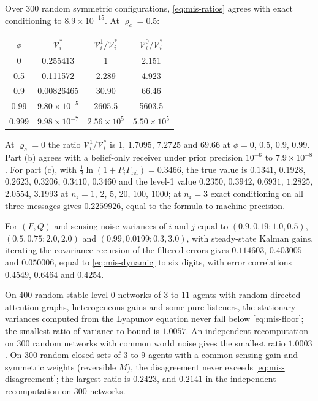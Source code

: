 \begin{numcheck}\label{chk:mis-ratios}
Over 300 random symmetric configurations, \eqref{eq:mis-ratios} agrees with exact conditioning to $8.9\times10^{-15}$. At $\varrho_c=0.5$:
\begin{center}\small
\begin{tabular}{@{}cccc@{}}
\toprule
$\phi$ & $\mathcal V^\ast_i$ & $\mathcal V^1_i/\mathcal V^\ast_i$ & $\mathcal V^0_i/\mathcal V^\ast_i$\\
\midrule
0 & 0.255413 & 1 & 2.151\\
0.5 & 0.111572 & 2.289 & 4.923\\
0.9 & 0.00826465 & 30.90 & 66.46\\
0.99 & $9.80\times10^{-5}$ & 2605.5 & 5603.5\\
0.999 & $9.98\times10^{-7}$ & $2.56\times10^5$ & $5.50\times10^5$\\
\bottomrule
\end{tabular}
\end{center}
At $\varrho_c=0$ the ratio $\mathcal V^1_i/\mathcal V^\ast_i$ is $1$, $1.7095$, $7.2725$ and $69.66$ at $\phi=0$, $0.5$, $0.9$, $0.99$. Part (b) agrees with a belief-only receiver under prior precision $10^{-6}$ to $7.9\times10^{-8}$. For part (c), with $\tfrac12\ln(1+P_i\Gamma_{\mathrm{rel}})=0.3466$, the true value is $0.1341$, $0.1928$, $0.2623$, $0.3206$, $0.3410$, $0.3460$ and the level-1 value $0.2350$, $0.3942$, $0.6931$, $1.2825$, $2.0554$, $3.1993$ at $n_{\mathrm r}=1$, $2$, $5$, $20$, $100$, $1000$; at $n_{\mathrm r}=3$ exact conditioning on all three messages gives $0.2259926$, equal to the formula to machine precision.
\end{numcheck}

\begin{numcheck}\label{chk:mis-dynamic}
For $(F,Q)$ and sensing noise variances of $i$ and $j$ equal to $(0.9,0.19;1.0,0.5)$, $(0.5,0.75;2.0,2.0)$ and $(0.99,0.0199;0.3,3.0)$, with steady-state Kalman gains, iterating the covariance recursion of the filtered errors gives $0.114603$, $0.403005$ and $0.050006$, equal to \eqref{eq:mis-dynamic} to six digits, with error correlations $0.4549$, $0.6464$ and $0.4254$.
\end{numcheck}

\begin{numcheck}\label{chk:mis-echo}
On 400 random stable level-0 networks of 3 to 11 agents with random directed attention graphs, heterogeneous gains and some pure listeners, the stationary variances computed from the Lyapunov equation never fall below \eqref{eq:mis-floor}; the smallest ratio of variance to bound is $1.0057$. An independent recomputation on 300 random networks with common world noise gives the smallest ratio $1.0003$. On 300 random closed sets of 3 to 9 agents with a common sensing gain and symmetric weights (reversible $M$), the disagreement never exceeds \eqref{eq:mis-disagreement}; the largest ratio is $0.2423$, and $0.2141$ in the independent recomputation on 300 networks.
\end{numcheck}

